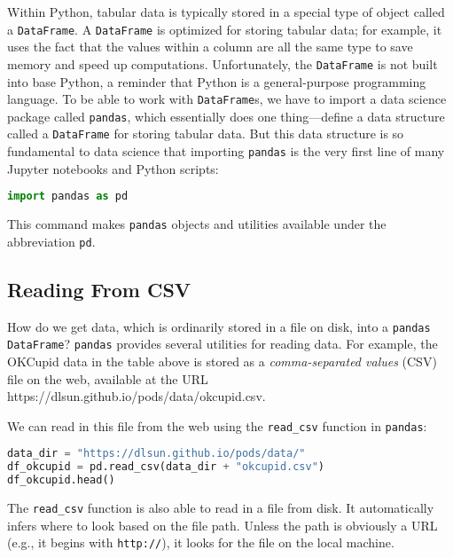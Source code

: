 Within Python, tabular data is typically stored in
a special type of object called a \verb|DataFrame|. A \verb|DataFrame| is optimized for storing tabular data; for example, it uses the fact that the values within a column are all the same type to save memory and speed up computations. Unfortunately, the \verb|DataFrame| is not built into base Python, a reminder that Python is a general-purpose programming language. To be able to work with \verb|DataFrame|s, we have to import a data science package called \verb|pandas|, which essentially does one thing---define a data structure called a \verb|DataFrame| for storing tabular data. But this data structure is so fundamental to data science that importing \verb|pandas| is the very first line of many Jupyter notebooks and Python scripts:

\begin{lstlisting}[language=Python]
import pandas as pd
\end{lstlisting}




This command makes \verb|pandas| objects and utilities
available under the abbreviation \verb|pd|.



\subsection{Reading From CSV}\label{1.1.1}

How do we get data, which is ordinarily stored in a file on disk,
into a \verb|pandas| \verb|DataFrame|? \verb|pandas| provides
several utilities for reading data. For example,
the OKCupid data in
the table above is stored as a \textit{comma-separated values} (CSV) file on
the web, available at the URL https://dlsun.github.io/pods/data/okcupid.csv.

We can read in this file from the web using the \verb|read_csv| function in \verb|pandas|:

\begin{lstlisting}[language=Python]
data_dir = "https://dlsun.github.io/pods/data/"
df_okcupid = pd.read_csv(data_dir + "okcupid.csv")
df_okcupid.head()
\end{lstlisting}




The \verb|read_csv| function is also able
to read in a file from disk. It automatically infers
where to look based on the file path.
Unless the path is obviously a URL (e.g., it begins with \verb|http://|), it looks for the file
on the local machine.



